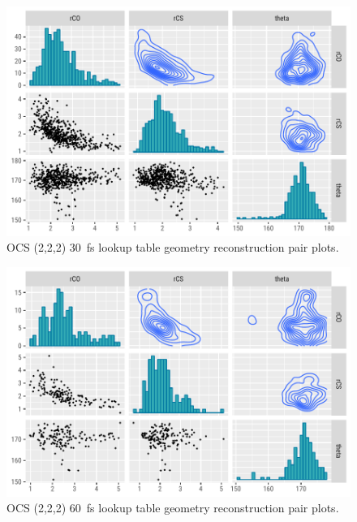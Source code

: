 \begin{figure}
  \centering
  \includegraphics[width=\textwidth]{Plots/OCS22230fsLTGeometryPairPlots}
  \caption[OCS (2,2,2) \SI{30}{\fs} lookup table geometry reconstruction pair plots.]
  {OCS (2,2,2) \SI{30}{\fs} lookup table geometry reconstruction pair plots.}
  \label{fig:OCS22230fsLTGeometryPairPlots}
\end{figure}

\begin{figure}
  \centering
  \includegraphics[width=\textwidth]{Plots/OCS22260fsLTGeometryPairPlots}
  \caption[OCS (2,2,2) \SI{60}{\fs} lookup table geometry reconstruction pair plots.]
  {OCS (2,2,2) \SI{60}{\fs} lookup table geometry reconstruction pair plots.}
  \label{fig:OCS22260fsLTGeometryPairPlots}
\end{figure}

